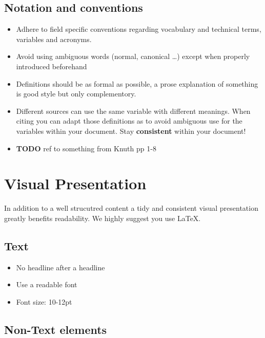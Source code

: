 \documentclass[nodate]{proc}
\begin{document}
\subsection{Notation and conventions}

\begin{itemize}
	\item Adhere to field specific conventions regarding vocabulary and technical terms, variables and acronyms.
	\item Avoid using ambiguous words (normal, canonical \dots) except when properly introduced beforehand
	\item Definitions should be as formal as possible, a prose explanation of something is good style but only complementory.
	\item Different sources can use the same variable with different meanings. When citing you can adapt those definitions as to avoid ambiguous use for the variables within your document. Stay \textbf{consistent} within your document!
	\item \textbf{TODO} ref to something from Knuth pp 1-8
\end{itemize}

\section{Visual Presentation}

In addition to a well strucutred content a tidy and consistent visual presentation greatly benefits readability. We highly suggest you use \LaTeX.

\subsection{Text}
\begin{itemize}
	\item No headline after a headline
	\item Use a readable font
	\item Font size: 10-12pt
\end{itemize}

\subsection{Non-Text elements}
\end{document}
